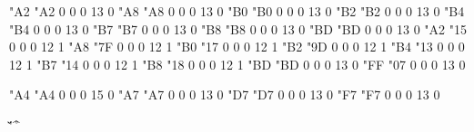 \ifx\xchrcode\xordcode %
\setcharcode  "A2  "A2    0    0     0  13  0    %
\setcharcode  "A8  "A8    0    0     0  13  0    %
\setcharcode  "B0  "B0    0    0     0  13  0    %
\setcharcode  "B2  "B2    0    0     0  13  0    %
\setcharcode  "B4  "B4    0    0     0  13  0    %
\setcharcode  "B7  "B7    0    0     0  13  0    %
\setcharcode  "B8  "B8    0    0     0  13  0    %
\setcharcode  "BD  "BD    0    0     0  13  0    %
\else                 %
\setcharcode  "A2  "15    0    0     0  12  1  %
\setcharcode  "A8  "7F    0    0     0  12  1  %
\setcharcode  "B0  "17    0    0     0  12  1  %
\setcharcode  "B2  "9D    0    0     0  12  1  %
\setcharcode  "B4  "13    0    0     0  12  1  %
\setcharcode  "B7  "14    0    0     0  12  1  %
\setcharcode  "B8  "18    0    0     0  12  1  %
\setcharcode  "BD  "BD    0    0     0  13  0   %
\setcharcode  "FF  "07    0    0     0  13  0    %
\fi

\setcharcode  "A4  "A4    0    0     0  15  0 %
\setcharcode  "A7  "A7    0    0     0  13  0  \expandto {\S}
\setcharcode  "D7  "D7    0    0     0  13  0  \expandto {$\times$}
\setcharcode  "F7  "F7    0    0     0  13  0  \expandto {$\div$}

\redefaccent \'
\redefaccent \v
\redefaccent \"
\redefaccent \^
\redefaccent \r

